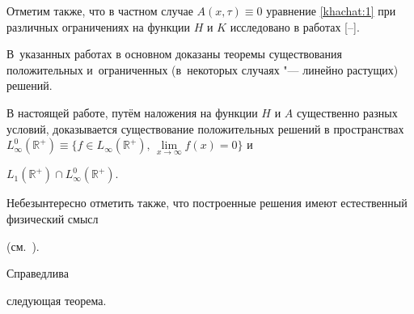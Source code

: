 Отметим также, что в частном случае $A(x,\tau)\equiv 0$ уравнение \eqref{khachat:1}  при различных ограничениях на функции $H$ и $K$ исследовано в работах [--].

В~указанных работах в основном доказаны теоремы существования положительных и~ограниченных (в~некоторых случаях "--- линейно растущих) решений.



В настоящей работе, путём наложения на функции $H$ и $A$ существенно разных условий, доказывается существование положительных решений в пространствах $L_{\infty}^0(\mathbb{R}^+)\equiv\{{f\in

L_{\infty}(\mathbb{R}^+),\,

\lim\limits_{x\rightarrow\infty}f(x)=0}\}$ и

$L_1(\mathbb{R}^+)\cap L_{\infty}^0(\mathbb{R}^+).$



Небезынтересно отметить также, что построенные решения имеют естественный физический смысл

(см.~\cite{popovkoval:bib:Khachatryan}).



\smallskip



 Справедлива

следующая теорема.



\smallskip

